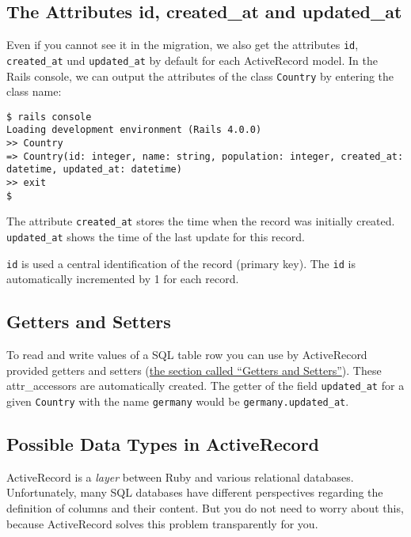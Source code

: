 \documentclass[a4paper]{book}
\newcounter{tab}[chapter]
\begin{document}
\subsection{The Attributes id, created\_at and updated\_at}\label{the-attributes-id-createdux5fat-and-updatedux5fat}

Even if you cannot see it in the migration, we also get the attributes \texttt{id}, \texttt{created\_at} und \texttt{updated\_at} by default for each ActiveRecord model. In the Rails console, we can output the attributes of the class \texttt{Country} by entering the class name:

\begin{shaded}\begin{verbatim}
$ rails console
Loading development environment (Rails 4.0.0)
>> Country
=> Country(id: integer, name: string, population: integer, created_at: datetime, updated_at: datetime)
>> exit
$
\end{verbatim}\end{shaded}

The attribute \texttt{created\_at} stores the time when the record was initially created. \texttt{updated\_at} shows the time of the last update for this record.

\texttt{id} is used a central identification of the record (primary key). The \texttt{id} is automatically incremented by 1 for each record.

\subsection{Getters and Setters}\label{getters-and-setters-1}

To read and write values of a SQL table row you can use by ActiveRecord provided getters and setters (\hyperref[rubyux5fgetterux5fandux5fsetter]{the section called “Getters and Setters”}). These attr\_accessors are automatically created. The getter of the field \texttt{updated\_at} for a given \texttt{Country} with the name \texttt{germany} would be \texttt{germany.updated\_at}.

\subsection{Possible Data Types in ActiveRecord}\label{possible-data-types-in-activerecord}

ActiveRecord is a \emph{layer} between Ruby and various relational databases. Unfortunately, many SQL databases have different perspectives regarding the definition of columns and their content. But you do not need to worry about this, because ActiveRecord solves this problem transparently for you.
\end{document}
